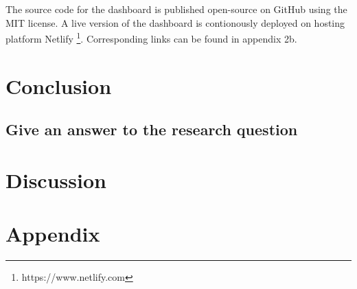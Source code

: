 The source code for the dashboard is published open-source on GitHub using the MIT license. A live version of the dashboard is contionously deployed on hosting platform Netlify \footnote{https://www.netlify.com}. Corresponding links can be found in appendix 2b.

\section{Conclusion}
\subsection{Give an answer to the research question}

\section{Discussion}

\section{Appendix}
